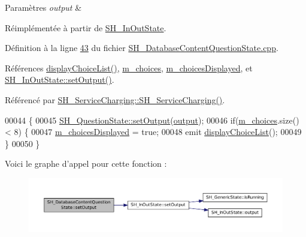 \begin{DoxyParams}{Paramètres}
{\em output} & \\
\hline
\end{DoxyParams}


Réimplémentée à partir de \hyperlink{classSH__InOutState_af611c84134e262739cd834797b315c80}{S\-H\-\_\-\-In\-Out\-State}.



Définition à la ligne \hyperlink{SH__DatabaseContentQuestionState_8cpp_source_l00043}{43} du fichier \hyperlink{SH__DatabaseContentQuestionState_8cpp_source}{S\-H\-\_\-\-Database\-Content\-Question\-State.\-cpp}.



Références \hyperlink{classSH__DatabaseContentQuestionState_acc79a171c2a70d52120676329a132dc4}{display\-Choice\-List()}, \hyperlink{classSH__DatabaseContentQuestionState_a0bbbd0d3b22877dc9e78f81136f31618}{m\-\_\-choices}, \hyperlink{classSH__DatabaseContentQuestionState_aff4d8f402d9299029038ec4f21271b2b}{m\-\_\-choices\-Displayed}, et \hyperlink{classSH__InOutState_af611c84134e262739cd834797b315c80}{S\-H\-\_\-\-In\-Out\-State\-::set\-Output()}.



Référencé par \hyperlink{classSH__ServiceCharging_afa5273d046049b1c2b020a6a19a8290b}{S\-H\-\_\-\-Service\-Charging\-::\-S\-H\-\_\-\-Service\-Charging()}.


\begin{DoxyCode}
00044 \{
00045     \hyperlink{classSH__InOutState_af611c84134e262739cd834797b315c80}{SH\_QuestionState::setOutput}(\hyperlink{classSH__InOutState_a17ed7eaf5e3ed5af80a4f9fe65d5bfd9}{output});
00046     \textcolor{keywordflow}{if}(\hyperlink{classSH__DatabaseContentQuestionState_a0bbbd0d3b22877dc9e78f81136f31618}{m\_choices}.size() < 8) \{
00047         \hyperlink{classSH__DatabaseContentQuestionState_aff4d8f402d9299029038ec4f21271b2b}{m\_choicesDisplayed} = \textcolor{keyword}{true};
00048         emit \hyperlink{classSH__DatabaseContentQuestionState_acc79a171c2a70d52120676329a132dc4}{displayChoiceList}();
00049     \}
00050 \}
\end{DoxyCode}


Voici le graphe d'appel pour cette fonction \-:\nopagebreak
\begin{figure}[H]
\begin{center}
\leavevmode
\includegraphics[width=350pt]{classSH__DatabaseContentQuestionState_aaec6c7f8bc78c6beb7447fc41ffe3875_cgraph}
\end{center}
\end{figure}




